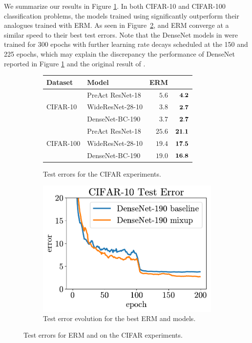 We summarize our results in Figure \ref{fig:cifar_results:table}. In both
CIFAR-10 and CIFAR-100 classification problems, the models trained using
\mixup{} significantly outperform their analogues trained with ERM. As seen in
Figure~\ref{fig:cifar_results:plot}, \mixup{} and ERM converge at a similar
speed to their best test errors.
%
Note that the DenseNet models in \citep{huang2017densely} were trained for 300
epochs with further learning rate decays scheduled at the 150 and 225 epochs,
which may explain the discrepancy the performance of DenseNet reported in
Figure \ref{fig:cifar_results:table} and the original result of
\citet{huang2017densely}.

\begin{figure}
	\centering
	\begin{subfigure}{0.6\textwidth}
		\centering
		\begin{tabular}[b]{ llrr }
            \toprule
			Dataset & Model & ERM &  \mixup{} \\
			\midrule
			\multirow{3}{*}{CIFAR-10} & PreAct ResNet-18 & $5.6$ &  $\bf 4.2$\\
			& WideResNet-28-10 & $3.8$ &  $\bf 2.7$\\
			& DenseNet-BC-190 & $3.7$ &  $\bf 2.7$\\
			\midrule
			\multirow{3}{*}{CIFAR-100} & PreAct ResNet-18 & $25.6$ &  $\bf 21.1$\\
			& WideResNet-28-10 & $19.4$ &  $\bf 17.5$\\
			& DenseNet-BC-190 & $19.0$ &  $\bf 16.8$\\
            \bottomrule
		\end{tabular}
        \caption{Test errors for the CIFAR experiments.}
        \label{fig:cifar_results:table}
	\end{subfigure}
	\hfill
	\begin{subfigure}{0.33\textwidth}
		\includegraphics[width=\textwidth]{images/cifar10_test_error.pdf}
        \caption{Test error evolution for the best ERM and \mixup{} models.}
        \label{fig:cifar_results:plot}
	\end{subfigure}
    \caption{Test errors for ERM and \mixup{} on the CIFAR experiments.}
    \label{fig:cifar_results}
\end{figure}


